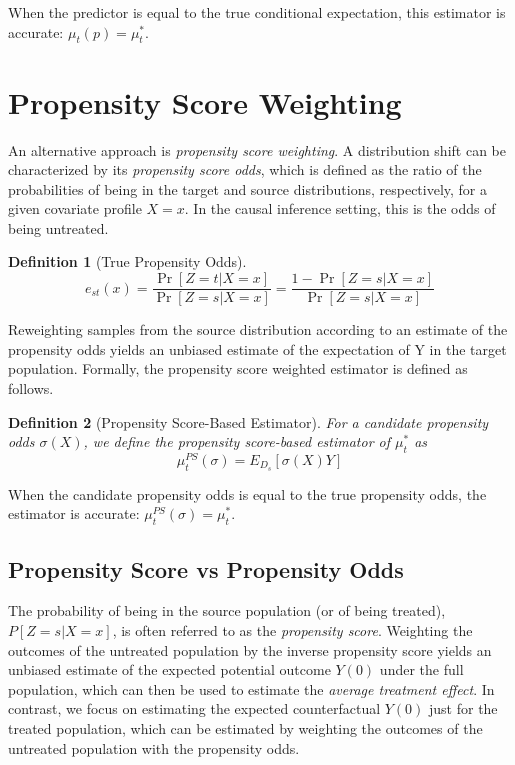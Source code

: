 \documentclass{article} %
\newtheorem{definition}{Definition}
\begin{document}

When the predictor is equal to the true conditional expectation, this estimator is accurate: $\mu_t(p) = \mu_t^*$.


\section{Propensity Score Weighting}

An alternative approach is \emph{propensity score weighting}. A distribution shift can be characterized by its \emph{propensity score odds}, which is defined as the ratio of the probabilities of being in the target and source distributions, respectively, for a given covariate profile $X = x$. In the causal inference setting, this is the odds of being untreated. 

\begin{definition}[True Propensity Odds]
\begin{equation*}
    e_{st}(x) = \frac{\Pr[Z = t | X = x]}{\Pr[Z = s | X=x]} = \frac{1 - \Pr[Z = s | X = x]}{\Pr[Z = s | X=x]}
\end{equation*}
\end{definition}

Reweighting samples from the source distribution according to an estimate of the propensity odds yields an unbiased estimate of the expectation of Y in the target population. Formally, the propensity score weighted estimator is defined as follows.

\begin{definition}[Propensity Score-Based Estimator]
\label{psest}
For a candidate propensity odds $\sigma(X)$, we define the propensity score-based estimator of $\mu_t^*$ as
\begin{equation*}
    \mu_t^{PS}(\sigma) = E_{D_s}[\sigma(X) Y ]
\end{equation*}
\end{definition}

When the candidate propensity odds is equal to the true propensity odds, the estimator is accurate: $\mu_t^{PS}(\sigma) = \mu_t^*$.


\subsection{Propensity Score vs Propensity Odds}
The probability of being in the source population (or of being treated), $P[Z=s|X=x]$, is often referred to as the \emph{propensity score}. Weighting the outcomes of the untreated population by the inverse propensity score yields an unbiased estimate of the expected potential outcome $Y(0)$ under the full population, which can then be used to estimate the \emph{average treatment effect}. In contrast, we focus on estimating the expected counterfactual $Y(0)$ just for the treated population, which can be estimated by weighting the outcomes of the untreated population with the propensity odds.
\end{document}
